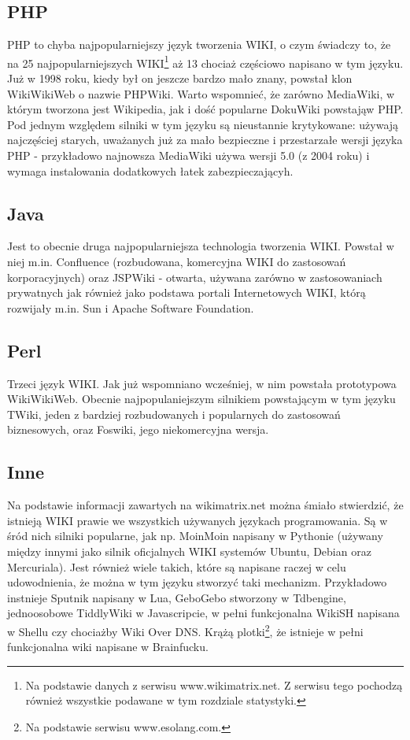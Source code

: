 \documentclass{article}
\begin{document}
	\subsection{PHP} 
	PHP to chyba najpopularniejszy język tworzenia WIKI, o czym świadczy to, że na 25 najpopularniejszych WIKI\footnote{Na podstawie danych z serwisu www.wikimatrix.net. Z serwisu tego pochodzą również wszystkie podawane w tym rozdziale statystyki.} aż 13 chociaż częściowo napisano w tym języku. Już w 1998 roku, kiedy był on jeszcze bardzo mało znany, powstał klon WikiWikiWeb o nazwie PHPWiki. Warto wspomnieć, że zarówno MediaWiki, w którym tworzona jest Wikipedia, jak i dość popularne DokuWiki powstająw PHP. Pod jednym względem silniki w tym języku są nieustannie krytykowane: używają najczęściej starych, uważanych już za mało bezpieczne i przestarzałe wersji języka PHP - przykładowo najnowsza MediaWiki używa wersji 5.0 (z 2004 roku) i wymaga instalowania dodatkowych łatek zabezpieczającyh.  
	\subsection{Java}
	Jest to obecnie druga najpopularniejsza technologia tworzenia WIKI. Powstał w niej m.in. Confluence (rozbudowana, komercyjna WIKI do zastosowań korporacyjnych) oraz JSPWiki - otwarta, używana zarówno w zastosowaniach prywatnych jak również jako podstawa portali Internetowych WIKI, którą rozwijały m.in. Sun i Apache Software Foundation.
	\subsection{Perl}
	Trzeci język WIKI. Jak już wspomniano wcześniej, w nim powstała prototypowa WikiWikiWeb. Obecnie najpopulaniejszym silnikiem powstającym w tym języku TWiki, jeden z bardziej rozbudowanych i popularnych do zastosowań biznesowych, oraz Foswiki, jego niekomercyjna wersja.  
	\subsection{Inne}
	Na podstawie informacji zawartych na wikimatrix.net można śmiało stwierdzić, że istnieją WIKI prawie we wszystkich używanych językach programowania. Są w śród nich silniki popularne, jak np. MoinMoin napisany w Pythonie (używany między innymi jako silnik oficjalnych WIKI systemów Ubuntu, Debian oraz Mercuriala). Jest również wiele takich, które są napisane raczej w celu udowodnienia, że można w tym języku stworzyć taki mechanizm. Przykładowo instnieje Sputnik napisany w Lua, GeboGebo stworzony w Tdbengine, jednoosobowe TiddlyWiki w Javascripcie, w pełni funkcjonalna WikiSH napisana w Shellu czy chociażby Wiki Over DNS. Krążą plotki\footnote{Na podstawie serwisu www.esolang.com.}, że istnieje w pełni funkcjonalna wiki napisane w Brainfucku. 	
\end{document}
